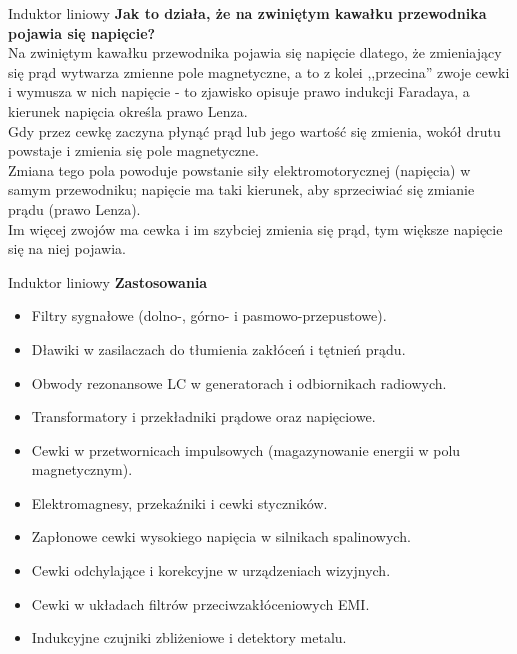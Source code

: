 \begin{frame}{Induktor liniowy}
	\textbf{Jak to działa, że na zwiniętym kawałku przewodnika pojawia się napięcie?}\\
	Na zwiniętym kawałku przewodnika pojawia się napięcie dlatego, że zmieniający się prąd wytwarza zmienne pole magnetyczne, a to z kolei ,,przecina'' zwoje cewki i wymusza w nich napięcie - to zjawisko opisuje prawo indukcji Faradaya, a kierunek napięcia określa prawo Lenza.\\
	Gdy przez cewkę zaczyna płynąć prąd lub jego wartość się zmienia, wokół drutu powstaje i zmienia się pole magnetyczne.\\
	Zmiana tego pola powoduje powstanie siły elektromotorycznej (napięcia) w samym przewodniku; napięcie ma taki kierunek, aby sprzeciwiać się zmianie prądu (prawo Lenza).\\
	Im więcej zwojów ma cewka i im szybciej zmienia się prąd, tym większe napięcie się na niej pojawia.
\end{frame}

\begin{frame}{Induktor liniowy}
	\textbf{Zastosowania}\\
	\begin{itemize}
		\item[\bt] Filtry sygnałowe (dolno-, górno- i pasmowo-przepustowe).
		\item[\bt] Dławiki w zasilaczach do tłumienia zakłóceń i tętnień prądu.
		\item[\bt] Obwody rezonansowe LC w generatorach i odbiornikach radiowych.
		\item[\bt] Transformatory i przekładniki prądowe oraz napięciowe.
		\item[\bt] Cewki w przetwornicach impulsowych (magazynowanie energii w polu magnetycznym).
		\item[\bt] Elektromagnesy, przekaźniki i cewki styczników.
		\item[\bt] Zapłonowe cewki wysokiego napięcia w silnikach spalinowych.
		\item[\bt] Cewki odchylające i korekcyjne w urządzeniach wizyjnych.
		\item[\bt] Cewki w układach filtrów przeciwzakłóceniowych EMI.
		\item[\bt] Indukcyjne czujniki zbliżeniowe i detektory metalu.
	\end{itemize}
\end{frame}

